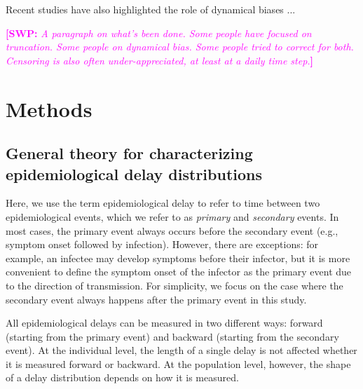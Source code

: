\documentclass[12pt]{article}
\newcommand{\comment}{\showcomment}
\newcommand{\showcomment}[3]{\textcolor{#1}{\textbf{[#2: }\textsl{#3}\textbf{]}}}
\newcommand{\swp}[1]{\comment{magenta}{SWP}{#1}}
\begin{document}
Recent studies have also highlighted the role of dynamical biases ...

\swp{A paragraph on what's been done. Some people have focused on truncation. Some people on dynamical bias. Some people tried to correct for both. Censoring is also often under-appreciated, at least at a daily time step.}

\section{Methods}

\subsection{General theory for characterizing epidemiological delay distributions}

Here, we use the term epidemiological delay to refer to time between two epidemiological events, which we refer to as \emph{primary} and \emph{secondary} events.
In most cases, the primary event always occurs before the secondary event (e.g., symptom onset followed by infection).
However, there are exceptions: for example, an infectee may develop symptoms before their infector, but it is more convenient to define the symptom onset of the infector as the primary event due to the direction of transmission.
For simplicity, we focus on the case where the secondary event always happens after the primary event in this study.

All epidemiological delays can be measured in two different ways: forward (starting from the primary event) and backward (starting from the secondary event).
At the individual level, the length of a single delay is not affected whether it is measured forward or backward.
At the population level, however, the shape of a delay distribution depends on how it is measured.
\end{document}

